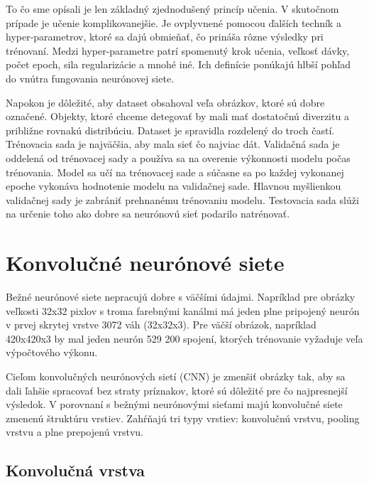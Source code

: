 To čo sme opísali je len základný zjednodušený princíp učenia. V skutočnom prípade je učenie komplikovanejšie. Je ovplyvnené pomocou ďalších techník a hyper-parametrov, ktoré sa dajú obmieňať, čo prináša rôzne výsledky pri trénovaní. Medzi hyper-parametre patrí spomenutý krok učenia, veľkosť dávky, počet epoch, sila regularizácie a mnohé iné. Ich definície ponúkajú hlbší pohľad do vnútra fungovania neurónovej siete.


Napokon je dôležité, aby dataset obsahoval veľa obrázkov, ktoré sú dobre označené. Objekty, ktoré chceme detegovať by mali mať dostatočnú diverzitu a približne rovnakú distribúciu. Dataset je spravidla rozdelený do troch častí. Trénovacia sada je najväčšia, aby mala sieť čo najviac dát. Validačná sada je oddelená od trénovacej sady a používa sa na overenie výkonnosti modelu počas trénovania. Model sa učí na trénovacej sade a súčasne sa po každej vykonanej epoche vykonáva hodnotenie modelu na validačnej sade. Hlavnou myšlienkou validačnej sady je zabrániť prehnanému trénovaniu modelu. Testovacia sada slúži na určenie toho ako dobre sa neurónovú sieť podarilo natrénovať.


\section{Konvolučné neurónové siete}

Bežné neurónové siete nepracujú dobre s väčšími údajmi. Napríklad pre obrázky veľkosti 32x32 pixlov s troma farebnými kanálmi má jeden plne pripojený neurón v prvej skrytej vrstve 3072 váh (32x32x3). Pre väčší obrázok, napríklad 420x420x3 by mal jeden neurón 529 200 spojení, ktorých trénovanie vyžaduje veľa výpočtového výkonu.

Cieľom konvolučných neurónových sietí (CNN) je zmenšiť obrázky tak, aby sa dali ľahšie spracovať bez straty príznakov, ktoré sú dôležité pre čo najpresnejší výsledok. V porovnaní s bežnými neurónovými sieťami majú konvolučné siete zmenenú štruktúru vrstiev. Zahŕňajú tri typy vrstiev: konvolučnú vrstvu, pooling vrstvu a plne prepojenú vrstvu.

\subsection{Konvolučná vrstva}

